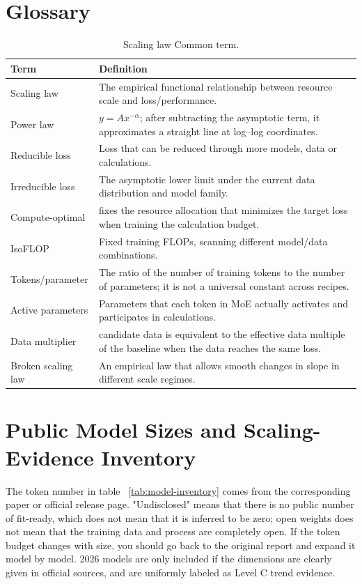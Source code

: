 \documentclass[UTF8,10pt,a4paper,fontset=none]{ctexart}
\begin{document}
\appendix
\clearpage
\section{Glossary}
\label{app:glossary}

\begin{table}[htbp]
\centering
\caption{Scaling law Common term. }\label{tab:glossary}
\begin{tabularx}{\textwidth}{p{3.6cm}X}
\toprule
Term & Definition \\
\midrule
Scaling law & The empirical functional relationship between resource scale and loss/performance. \\
Power law & $y=A x^{-\alpha}$; after subtracting the asymptotic term, it approximates a straight line at log--log coordinates. \\
Reducible loss & Loss that can be reduced through more models, data or calculations. \\
Irreducible loss & The asymptotic lower limit under the current data distribution and model family. \\
Compute-optimal & fixes the resource allocation that minimizes the target loss when training the calculation budget. \\
IsoFLOP & Fixed training FLOPs, scanning different model/data combinations. \\
Tokens/parameter & The ratio of the number of training tokens to the number of parameters; it is not a universal constant across recipes. \\
Active parameters & Parameters that each token in MoE actually activates and participates in calculations. \\
Data multiplier & candidate data is equivalent to the effective data multiple of the baseline when the data reaches the same loss. \\
Broken scaling law & An empirical law that allows smooth changes in slope in different scale regimes. \\
\bottomrule
\end{tabularx}
\end{table}

\section{Public Model Sizes and Scaling-Evidence Inventory}
\label{app:model-inventory}

The token number in table ~\ref{tab:model-inventory} comes from the corresponding paper or official release page. "Undisclosed" means that there is no public number of fit-ready, which does not mean that it is inferred to be zero; open weights does not mean that the training data and process are completely open. If the token budget changes with size, you should go back to the original report and expand it model by model. 2026 models are only included if the dimensions are clearly given in official sources, and are uniformly labeled as Level C trend evidence.
\end{document}
